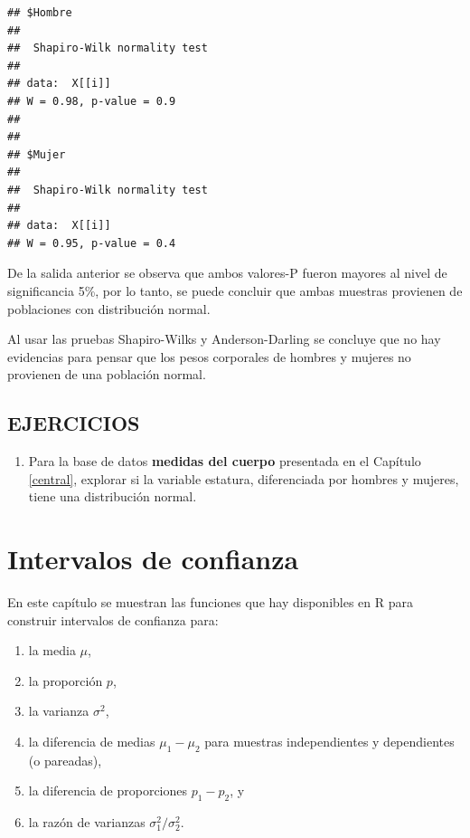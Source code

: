 \documentclass[10pt,]{krantz}
\providecommand{\tightlist}{%
  \setlength{\itemsep}{0pt}\setlength{\parskip}{0pt}}
\let\proglang=\textsf
\begin{document}
\begin{verbatim}
## $Hombre
## 
##  Shapiro-Wilk normality test
## 
## data:  X[[i]]
## W = 0.98, p-value = 0.9
## 
## 
## $Mujer
## 
##  Shapiro-Wilk normality test
## 
## data:  X[[i]]
## W = 0.95, p-value = 0.4
\end{verbatim}

De la salida anterior se observa que ambos valores-P fueron mayores al
nivel de significancia 5\%, por lo tanto, se puede concluir que ambas
muestras provienen de poblaciones con distribución normal.

Al usar las pruebas Shapiro-Wilks y Anderson-Darling se concluye que no
hay evidencias para pensar que los pesos corporales de hombres y mujeres
no provienen de una población normal.

\section*{EJERCICIOS}\label{ejercicios-7}


\begin{enumerate}
\def\labelenumi{\arabic{enumi}.}
\tightlist
\item
  Para la base de datos \textbf{medidas del cuerpo} presentada en el
  Capítulo \ref{central}, explorar si la variable estatura, diferenciada
  por hombres y mujeres, tiene una distribución normal.
\end{enumerate}

\chapter{Intervalos de confianza}\label{intervalos-de-confianza}

En este capítulo se muestran las funciones que hay disponibles en
\proglang{R} para construir intervalos de confianza para:

\begin{enumerate}
\def\labelenumi{\arabic{enumi}.}
\tightlist
\item
  la media \(\mu\),
\item
  la proporción \(p\),
\item
  la varianza \(\sigma^2\),
\item
  la diferencia de medias \(\mu_1-\mu_2\) para muestras independientes y
  dependientes (o pareadas),
\item
  la diferencia de proporciones \(p_1 - p_2\), y
\item
  la razón de varianzas \(\sigma_1^2 / \sigma_2^2\).
\end{enumerate}
\end{document}
